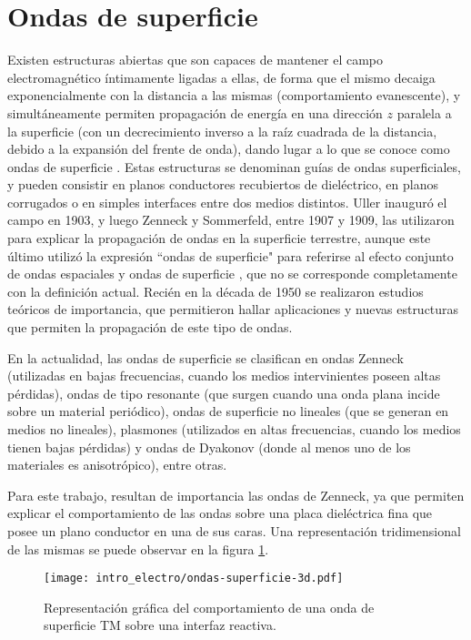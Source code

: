\section{Ondas de superficie}
\label{sec:ondas-de-superficie}
Existen estructuras abiertas que son capaces de mantener el campo electromagnético íntimamente ligadas a ellas, de forma que el mismo decaiga exponencialmente con la distancia a las mismas (comportamiento evanescente), y simultáneamente permiten propagación de energía en una dirección $z$ paralela a la superficie (con un decrecimiento inverso a la raíz cuadrada de la distancia, debido a la expansión del frente de onda), dando lugar a lo que se conoce como ondas de superficie \cite{Barlow:SurfaceWaves}. Estas estructuras se denominan guías de ondas superficiales, y pueden consistir en planos conductores recubiertos de dieléctrico, en planos corrugados o en simples interfaces entre dos medios distintos. Uller inauguró el campo en 1903, y luego Zenneck y Sommerfeld, entre 1907 y 1909, las utilizaron para explicar la propagación de ondas en la superficie terrestre, aunque este último utilizó la expresión ``ondas de superficie" para referirse al efecto conjunto de ondas espaciales y ondas de superficie \cite{Barlow:SurfaceWaves}, que no se corresponde completamente con la definición actual. Recién en la década de 1950 se realizaron estudios teóricos de importancia, que permitieron hallar aplicaciones y nuevas estructuras que permiten la propagación de este tipo de ondas.

En la actualidad, las ondas de superficie se clasifican en ondas Zenneck (utilizadas en bajas frecuencias, cuando los medios intervinientes poseen altas pérdidas), ondas de tipo resonante (que surgen cuando una onda plana incide sobre un material periódico), ondas de superficie no lineales (que se generan en medios no lineales), plasmones (utilizados en altas frecuencias, cuando los medios tienen bajas pérdidas) y ondas de Dyakonov (donde al menos uno de los materiales es anisotrópico), entre otras.

Para este trabajo, resultan de importancia las ondas de Zenneck, ya que permiten explicar el comportamiento de las ondas sobre una placa dieléctrica fina que posee un plano conductor en una de sus caras. Una representación tridimensional de las mismas se puede observar en la figura \ref{fig:onda-superficie-3d}.

\begin{figure}[htp]
	\centering
	\texttt{[image: intro\_electro/ondas-superficie-3d.pdf]}
	\caption{Representación gráfica del comportamiento de una onda de superficie TM sobre una interfaz reactiva.}
	\label{fig:onda-superficie-3d}
\end{figure}

